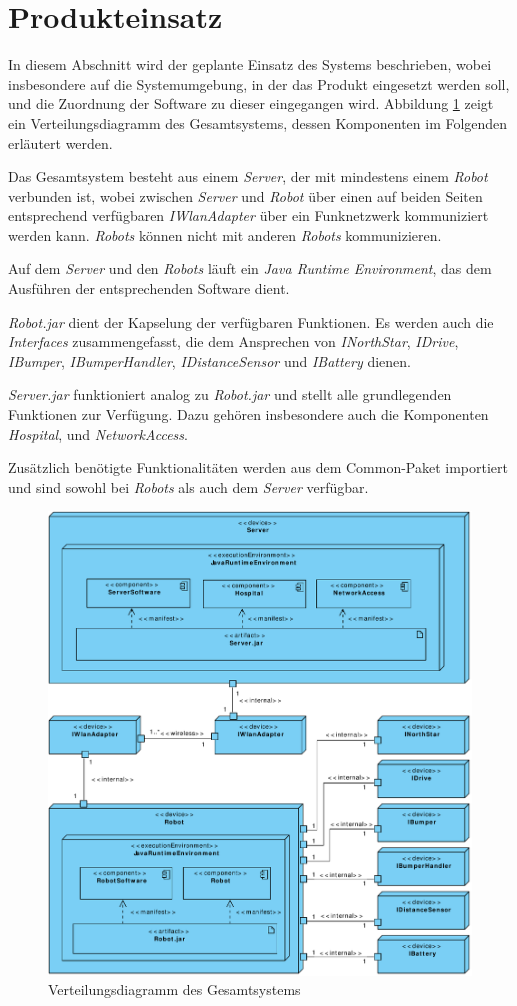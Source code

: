 \section{Produkteinsatz}

In diesem Abschnitt wird der geplante Einsatz des Systems beschrieben, wobei insbesondere auf die Systemumgebung, in der das Produkt eingesetzt werden soll, und die Zuordnung der Software zu dieser eingegangen wird. Abbildung \ref{ProdukteinsatzKomp} zeigt ein Verteilungsdiagramm des Gesamtsystems, dessen Komponenten im Folgenden erläutert werden.

Das Gesamtsystem besteht aus einem \emph{Server}, der mit mindestens einem \emph{Robot} verbunden ist, wobei zwischen \emph{Server} und \emph{Robot} über einen auf beiden Seiten entsprechend verfügbaren \emph{IWlan\-Adapter} über ein Funknetzwerk kommuniziert werden kann. \emph{Robots} können nicht mit anderen \emph{Robots} kommunizieren.

Auf dem \emph{Server} und den \emph{Robots} läuft ein \emph{Java Runtime Environment}, das dem Ausführen der entsprechenden Software dient.

\emph{Robot.jar} dient der Kapselung der verfügbaren Funktionen. Es werden auch die \emph{Interfaces} zusammengefasst, die dem Ansprechen von \emph{INorthStar}, \emph{IDrive}, \emph{IBumper}, \emph{IBumperHandler}, \emph{IDistanceSensor} und \emph{IBattery} dienen.

\emph{Server.jar} funktioniert analog zu \emph{Robot.jar} und stellt alle grundlegenden Funktionen zur Verfügung. Dazu gehören insbesondere auch die Komponenten \emph{Hospital}, und \emph{NetworkAccess}.

Zusätzlich benötigte Funktionalitäten werden aus dem Common-Paket importiert und sind sowohl bei \emph{Robots} als auch dem \emph{Server} verfügbar.

\begin{figure}[H]
	\centering
	\includegraphics[width=1\textwidth]{img/1-Entwurf-9-Produkteinsatz}
	\caption{Verteilungsdiagramm des Gesamtsystems}
	\label{ProdukteinsatzKomp}
\end{figure}